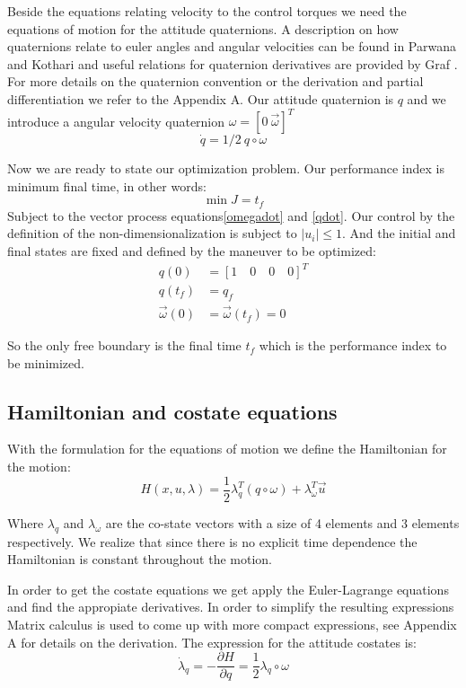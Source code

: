 Beside the equations relating velocity to the control torques we need the equations of motion for the attitude quaternions. A description on how quaternions relate to euler angles and angular velocities can be found in Parwana and Kothari\cite{parwana2017quaternion} and useful relations for quaternion derivatives are provided by Graf \cite{graf2008quaternions}. For more details on the quaternion convention or the derivation and partial differentiation we refer to the Appendix A. Our attitude quaternion is $q$ and we introduce a angular velocity quaternion $\omega = [0 \ \vec{\omega}]^T$
\begin{equation}
\label{qdot}
\dot{q} = 1/2  \ q \circ \omega
\end{equation}

Now we are ready to state our optimization problem. Our performance index is minimum final time, in other words:
\begin{equation}
\min J = t_f
\end{equation}
Subject to the vector process equations\ref{omegadot} and  \ref{qdot}. Our control by the definition of the non-dimensionalization is subject to $|u_i| \leq 1$. And the initial and final states are fixed and defined by the maneuver to be optimized:
\begin{align}
 q(0) &= \left[ 1 \quad 0 \quad 0 \quad 0 \right]^T \\
 q(t_f) &= q_f \\
 \vec{\omega}(0) &= \vec{\omega}(t_f) = 0
\end{align}

So the only free boundary is the final time $t_f$ which is the performance index to be minimized.

\subsection{Hamiltonian and costate equations}
With the formulation for the equations of motion we define the Hamiltonian for the motion:
\begin{equation}
H(x,u,\lambda) = \frac{1}{2} \lambda_q^T (q \circ \omega) + \lambda_\omega^T \vec{u}
\end{equation}

Where $\lambda_q$ and $\lambda_\omega$ are the co-state vectors with a size of 4 elements and 3 elements respectively. We realize that since there is no explicit time dependence the Hamiltonian is constant throughout the motion. 

In order to get the costate equations we get apply the Euler-Lagrange equations and find the appropiate derivatives. In order to simplify the resulting expressions Matrix calculus is used to come up with more compact expressions, see Appendix A for details on the derivation. The expression for the attitude costates is:
\begin{equation}
\label{lambdaqDot}
\dot{\lambda}_q = - \frac{\partial H}{\partial q} =  \frac{1}{2} \lambda_q \circ \omega
\end{equation}

